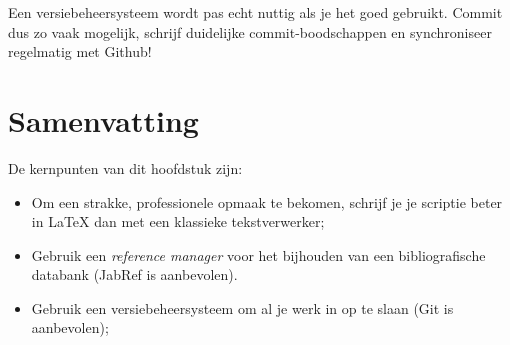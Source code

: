 Een versiebeheersysteem wordt pas echt nuttig als je het goed gebruikt. Commit dus zo vaak mogelijk, schrijf duidelijke commit-boodschappen en synchroniseer regelmatig met Github!

\section{Samenvatting}%
\label{sec:voorbereiding-samenvatting}

De kernpunten van dit hoofdstuk zijn:

\begin{itemize}
  \item Om een strakke, professionele opmaak te bekomen, schrijf je je scriptie beter in {\LaTeX} dan met een klassieke tekstverwerker;
  \item Gebruik een \emph{reference manager} voor het bijhouden van een bibliografische databank (JabRef is aanbevolen).
  \item Gebruik een versiebeheersysteem om al je werk in op te slaan (Git is aanbevolen);
\end{itemize}
